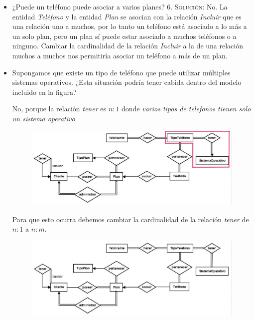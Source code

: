 \documentclass[letterpaper,11pt]{article}
\begin{document}
\begin{itemize}
    \item ¿Puede un teléfono puede asociar a varios planes?
    6.
    \textsc{Solución:} No. La entidad \textit{Teléfono} y la entidad \textit{Plan} se asocian con la relación \textit{Incluir} que es una relación uno a muchos, por lo tanto un teléfono está asociado a lo más a un solo plan, pero un plan sí puede estar asociado a muchos teléfonos o a ninguno. Cambiar la cardinalidad de la relación \textit{Incluir} a la de una relación muchos a muchos nos permitiría asociar un teléfono a más de un plan.

    \item Supongamos que existe un tipo de teléfono que puede utilizar múltiples
    sistemas operativos. ¿Esta situación podría tener cabida dentro del modelo
    incluido en la figura?

    No, porque la relación \textit{tener} es $n:1$ donde \textit{varios tipos de
    telefonos tienen solo un sistema operativo}

    \begin{figure}[H]
        \centering
        \includegraphics[scale=0.4]{./imagenes/modelo7a.jpg}
    \end{figure}

    Para que esto ocurra debemos cambiar la cardinalidad de la relación
    \textit{tener} de $n:1$ a $n:m$.
    \begin{figure}[H]
        \centering
        \includegraphics[scale=0.4]{./imagenes/modelo7b.jpg}
    \end{figure}


\end{itemize}
\end{document}
